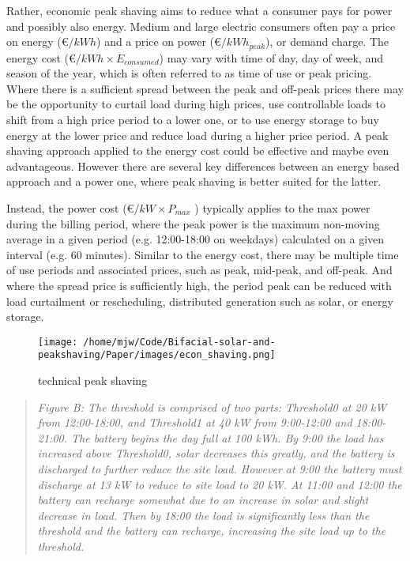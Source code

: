 \documentclass[
]{article}
\begin{document}
Rather, economic peak shaving aims to reduce what a consumer pays for
power and possibly also energy. Medium and large electric consumers
often pay a price on energy (€\(/kWh\)) and a price on power
(€\(/kWh_{peak}\)), or demand charge. The energy cost
(€\(/kWh \times E_{consumed}\)) may vary with time of day, day of week,
and season of the year, which is often referred to as time of use or
peak pricing. Where there is a sufficient spread between the peak and
off-peak prices there may be the opportunity to curtail load during high
prices, use controllable loads to shift from a high price period to a
lower one, or to use energy storage to buy energy at the lower price and
reduce load during a higher price period. A peak shaving approach
applied to the energy cost could be effective and maybe even
advantageous. However there are several key differences between an
energy based approach and a power one, where peak shaving is better
suited for the latter.

Instead, the power cost (€\(/kW \times P_{max}\) ) typically applies to
the max power during the billing period, where the peak power is the
maximum non-moving average in a given period (e.g. 12:00-18:00 on
weekdays) calculated on a given interval (e.g. 60 minutes). Similar to
the energy cost, there may be multiple time of use periods and
associated prices, such as peak, mid-peak, and off-peak. And where the
spread price is sufficiently high, the period peak can be reduced with
load curtailment or rescheduling, distributed generation such as solar,
or energy storage.

\begin{figure}
\centering
\texttt{[image: /home/mjw/Code/Bifacial-solar-and-peakshaving/Paper/images/econ\_shaving.png]}
\caption{technical peak shaving}
\end{figure}

\begin{quote}
\emph{Figure B: The threshold is comprised of two parts: Threshold0 at
20 kW from 12:00-18:00, and Threshold1 at 40 kW from 9:00-12:00 and
18:00-21:00. The battery begins the day full at 100 kWh. By 9:00 the
load has increased above Threshold0, solar decreases this greatly, and
the battery is discharged to further reduce the site load. However at
9:00 the battery must discharge at 13 kW to reduce to site load to 20
kW. At 11:00 and 12:00 the battery can recharge somewhat due to an
increase in solar and slight decrease in load. Then by 18:00 the load is
significantly less than the threshold and the battery can recharge,
increasing the site load up to the threshold.}
\end{quote}
\end{document}
